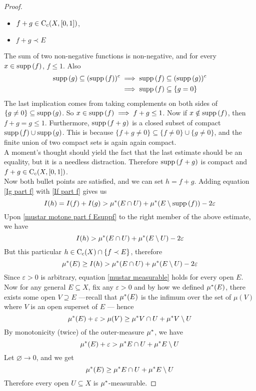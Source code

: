 \documentclass[../../main.tex]{subfiles}
\begin{document}
\begin{proof}
\begin{itemize}
    \item $f+g\in\operatorname{C}_c({X,[0,1]})$,
    \item $f+g\prec E$
\end{itemize}
The sum of two non-negative functions is non-negative, and for every $x\in\operatorname{supp}{(f)}$, $f\leq 1$. Also
\begin{align*}
    \operatorname{supp}{(g)}\subseteq (\operatorname{supp}{(f)})^c&\implies\operatorname{supp}{(f)}\subseteq (\operatorname{supp}{(g)})^c\\
    &\implies \operatorname{supp}{(f)}\subseteq \{g=0\}
\end{align*}
The last implication comes from taking complements on both sides of $\{g\neq 0\}\subseteq \operatorname{supp}{(g)}$. So $x\in\operatorname{supp}{(f)}\implies f+g\leq 1$. Now if $x\notin\operatorname{supp}{(f)}$, then $f+g=g\leq 1$. Furthermore, $\operatorname{supp}{(f+g)}$ is a closed subset of compact $\operatorname{supp}{(f)}\cup\operatorname{supp}{(g)}$. This is because $\{f+g\neq 0\}\subseteq \{f\neq 0\}\cup\{g\neq 0\}$, and the finite union of two compact sets is again again compact.\\

A moment's thought should yield the fact that the last estimate should be an equality, but it is a needless distraction. Therefore $\operatorname{supp}{(f+g)}$ is compact and $f+g\in\operatorname{C}_c({X,[0,1]})$.\\

Now both bullet points are satisfied, and we can set $h=f+g$. Adding equation \eqref{Ig part f} with \eqref{If part f} gives us
\[
I(h) = I(f) + I(g) > \mu^*(E\cap U)+\mu^*(E\setminus \operatorname{supp}{(f)})-2\varepsilon
\]
Upon \eqref{mustar motone part f Esuppf} to the right member of the above estimate, we have
\[
I(h)>\mu^*(E\cap U)+\mu^*(E\setminus U)-2\varepsilon
\]
But this particular $h\in\operatorname{C}_c({X})\cap\{f\prec E\}$, therefore
\[
\mu^*(E)\geq I(h)>\mu^*(E\cap U)+\mu^*(E\setminus U)-2\varepsilon
\]
Since $\varepsilon>0$ is arbitrary, equation \eqref{mustar measurable} holds for every open $E$. Now for any general $E\subseteq X$, fix any $\varepsilon>0$ and by how we defined $\mu^*(E)$, there exists some open $V\supseteq E$ —recall that $\mu^*(E)$ is the infimum over the set of $\mu(V)$ where $V$ is an open superset of $E$ — hence
\[
\mu^*(E)+\varepsilon>\mu(V)\geq\mu^*{V\cap U} + \mu^*{V\setminus U}
\]
By monotonicity (twice) of the outer-measure $\mu^*$, we have
\[
\mu^*(E)+\varepsilon>\mu^*{E\cap U} + \mu^*{E\setminus U}
\]
Let $\varnothing\to 0$, and we get
\[
\mu^*(E)\geq \mu^*{E\cap U} + \mu^*{E\setminus U}
\]
Therefore every open $U\subseteq X$ is $\mu^*$-measurable.
\end{proof}
\end{document}
